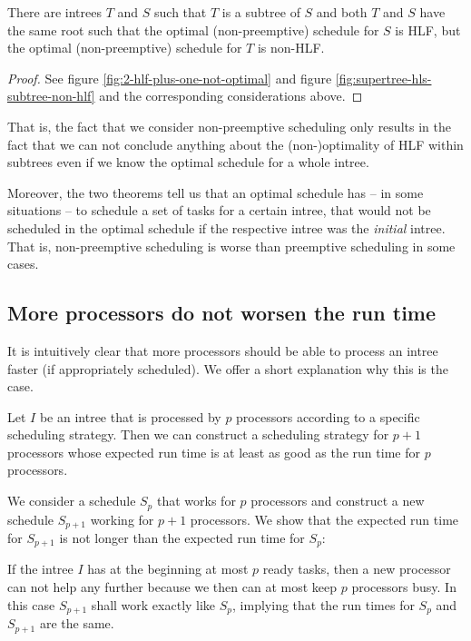 \begin{theorem}
  There are intrees $T$ and $S$ such that $T$ is a subtree of $S$ and both $T$ and $S$ have the same root such that the optimal (non-preemptive) schedule for $S$ is HLF, but the optimal (non-preemptive) schedule for $T$ is non-HLF.
\end{theorem}

\begin{proof}
  See figure \ref{fig:2-hlf-plus-one-not-optimal} and figure \ref{fig:supertree-hls-subtree-non-hlf} and the corresponding considerations above.
\end{proof}

That is, the fact that we consider non-preemptive scheduling only results in the fact that we can not conclude anything about the (non-)optimality of HLF within subtrees even if we know the optimal schedule for a whole intree.

Moreover, the two theorems tell us that an optimal schedule has -- in some situations -- to schedule a set of tasks for a certain intree, that would not be scheduled in the optimal schedule if the respective intree was the \emph{initial} intree. That is, non-preemptive scheduling is worse than preemptive scheduling in some cases.

\subsection{More processors do not worsen the run time}
\label{sec:properties-more-processors-are-better}

It is intuitively clear that more processors should be able to process an intree faster (if appropriately scheduled). We offer a short explanation why this is the case.

\begin{theorem}
  Let $I$ be an intree that is processed by $p$ processors according to a specific scheduling strategy. Then we can construct a scheduling strategy for $p+1$ processors whose expected run time is at least as good as the run time for $p$ processors.
\end{theorem}

  We consider a schedule $S_p$ that works for $p$ processors and construct a new schedule $S_{p+1}$ working for $p+1$ processors. We show that the expected run time for $S_{p+1}$ is not longer than the expected run time for $S_p$:

  If the intree $I$ has at the beginning at most $p$ ready tasks, then a new processor can not help any further because we then can at most keep $p$ processors busy. In this case $S_{p+1}$ shall work exactly like $S_p$, implying that the run times for $S_p$ and $S_{p+1}$ are the same.

